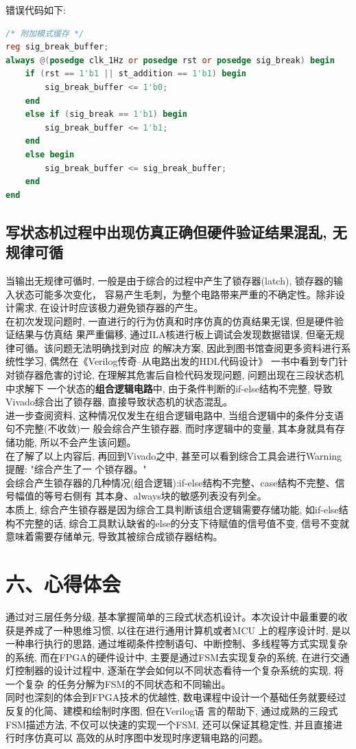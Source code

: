\documentclass{article}
\newcommand{\fourhao}{\fontsize{14pt}{\baselineskip}\selectfont} %
\newcommand{\xiaosihao}{\fontsize{12pt}{\baselineskip}\selectfont} %
\begin{document}
错误代码如下:
\begin{lstlisting}[language=Verilog, caption={综合不理想代码}]
/* 附加模式缓存 */
reg sig_break_buffer;
always @(posedge clk_1Hz or posedge rst or posedge sig_break) begin
    if (rst == 1'b1 || st_addition == 1'b1) begin
        sig_break_buffer <= 1'b0;
    end
    else if (sig_break == 1'b1) begin
        sig_break_buffer <= 1'b1;
    end
    else begin
        sig_break_buffer <= sig_break_buffer;
    end
end
\end{lstlisting}
\subsection*{写状态机过程中出现仿真正确但硬件验证结果混乱, 无规律可循}
当输出无规律可循时, 一般是由于综合的过程中产生了锁存器(latch), 锁存器的输入状态可能多次变化，
容易产生毛刺，为整个电路带来严重的不确定性。除非设计需求, 在设计时应该极力避免锁存器的产生。\\

在初次发现问题时, 一直进行的行为仿真和时序仿真的仿真结果无误, 但是硬件验证结果与仿真结
果严重偏移, 通过ILA核进行板上调试会发现数据错误, 但毫无规律可循。该问题无法明确找到对应
的解决方案, 因此到图书馆查阅更多资料进行系统性学习, 偶然在《Verilog传奇--从电路出发的HDL代码设计》
一书中看到专门针对锁存器危害的讨论, 在理解其危害后自检代码发现问题, 问题出现在三段状态机中求解下
一个状态的\textbf{组合逻辑电路}中, 由于条件判断的if-else结构不完整, 导致Vivado综合出了锁存器, 直接导致状态机的状态混乱。\\

进一步查阅资料, 这种情况仅发生在组合逻辑电路中, 当组合逻辑中的条件分支语句不完整(不收敛)一
般会综合产生锁存器, 而时序逻辑中的变量, 其本身就具有存储功能, 所以不会产生该问题。\\

在了解了以上内容后, 再回到Vivado之中, 甚至可以看到综合工具会进行Warning提醒: "综合产生了一
个锁存器。"\\

会综合产生锁存器的几种情况(组合逻辑):if-else结构不完整、case结构不完整、信号幅值的等号右侧有
其本身、always块的敏感列表没有列全。\\

本质上, 综合产生锁存器是因为综合工具判断该组合逻辑需要存储功能, 如if-else结构不完整的话, 
综合工具默认缺省的else的分支下待赋值的信号值不变, 信号不变就意味着需要存储单元, 导致其被综合成锁存器结构。
\section*{\fourhao 六、心得体会}
\xiaosihao
{}
通过对三层任务分级, 基本掌握简单的三段式状态机设计。本次设计中最重要的收获是养成了一种思维习惯, 以往在进行通用计算机或者MCU
上的程序设计时, 是以一种串行执行的思路, 通过堆砌条件控制语句、中断控制、多线程等方式实现复杂的系统, 而在FPGA的硬件设计中, 
主要是通过FSM去实现复杂的系统, 在进行交通灯控制器的设计过程中, 逐渐在学会如何以不同状态看待一个复杂系统的实现, 将一个复杂
的任务分解为FSM的不同状态和不同输出。\\

同时也深刻的体会到FPGA技术的优越性, 数电课程中设计一个基础任务就要经过反复的化简、建模和绘制时序图, 但在Verilog语
言的帮助下, 通过成熟的三段式FSM描述方法, 不仅可以快速的实现一个FSM, 还可以保证其稳定性, 并且直接进行时序仿真可以
高效的从时序图中发现时序逻辑电路的问题。
\end{document}

